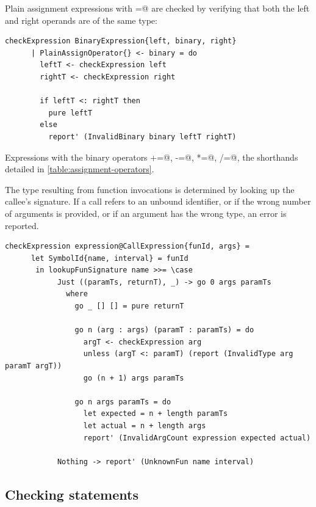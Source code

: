 \documentclass[UdineBachThesis,american,11pt]{PhdThesis}
\begin{document}
  Plain assignment expressions with \lstinline@=@ are checked by verifying that
  both the left and right operands are of the same type:

  \begin{lstlisting}[gobble=4,basicstyle=\ttfamily\small]
    checkExpression BinaryExpression{left, binary, right}
      | PlainAssignOperator{} <- binary = do
        leftT <- checkExpression left
        rightT <- checkExpression right

        if leftT <: rightT then
          pure leftT
        else
          report' (InvalidBinary binary leftT rightT)
  \end{lstlisting}

  Expressions with the binary operators \lstinline@+=@, \lstinline@-=@,
  \lstinline@*=@, \lstinline@/=@, \lstinline@%=@ are type checked considering
  the shorthands detailed in \autoref{table:assignment-operators}.

  The type resulting from function invocations is determined by looking up the
  callee's signature. If a call refers to an unbound identifier, or if the wrong
  number of arguments is provided, or if an argument has the wrong type, an
  error is reported.

  \begin{lstlisting}[gobble=4,basicstyle=\ttfamily\small]
    checkExpression expression@CallExpression{funId, args} =
      let SymbolId{name, interval} = funId
       in lookupFunSignature name >>= \case
            Just ((paramTs, returnT), _) -> go 0 args paramTs
              where
                go _ [] [] = pure returnT

                go n (arg : args) (paramT : paramTs) = do
                  argT <- checkExpression arg
                  unless (argT <: paramT) (report (InvalidType arg paramT argT))
                  go (n + 1) args paramTs

                go n args paramTs = do
                  let expected = n + length paramTs
                  let actual = n + length args
                  report' (InvalidArgCount expression expected actual)

            Nothing -> report' (UnknownFun name interval)
  \end{lstlisting}

  \newpage

  \subsection{Checking statements}
\end{document}

